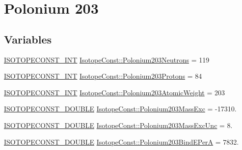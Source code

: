 \hypertarget{group___isotope_const-_polonium-_po203}{}\section{Polonium 203}
\label{group___isotope_const-_polonium-_po203}
\subsection*{Variables}
\begin{DoxyCompactItemize}
\item 
\mbox{\hyperlink{group___isotope_const-_macros_ga5f18360b3e99483a35c32d789e62621c}{I\+S\+O\+T\+O\+P\+E\+C\+O\+N\+S\+T\+\_\+\+I\+NT}} \mbox{\hyperlink{group___isotope_const-_polonium-_po203_gad34dfe27de2839b8dc656c7039330911}{Isotope\+Const\+::\+Polonium203\+Neutrons}} = 119
\item 
\mbox{\hyperlink{group___isotope_const-_macros_ga5f18360b3e99483a35c32d789e62621c}{I\+S\+O\+T\+O\+P\+E\+C\+O\+N\+S\+T\+\_\+\+I\+NT}} \mbox{\hyperlink{group___isotope_const-_polonium-_po203_ga0ed0792985d9912199b290924bc2a84c}{Isotope\+Const\+::\+Polonium203\+Protons}} = 84
\item 
\mbox{\hyperlink{group___isotope_const-_macros_ga5f18360b3e99483a35c32d789e62621c}{I\+S\+O\+T\+O\+P\+E\+C\+O\+N\+S\+T\+\_\+\+I\+NT}} \mbox{\hyperlink{group___isotope_const-_polonium-_po203_gad083c15521cf9ab6bb1863c5d521081b}{Isotope\+Const\+::\+Polonium203\+Atomic\+Weight}} = 203
\item 
\mbox{\hyperlink{group___isotope_const-_macros_ga8f45a7272ce02c0b4c65c44636ed719a}{I\+S\+O\+T\+O\+P\+E\+C\+O\+N\+S\+T\+\_\+\+D\+O\+U\+B\+LE}} \mbox{\hyperlink{group___isotope_const-_polonium-_po203_gadf9dc3a7632f7ef079c24e460efe82cf}{Isotope\+Const\+::\+Polonium203\+Mass\+Exc}} = -\/17310.
\item 
\mbox{\hyperlink{group___isotope_const-_macros_ga8f45a7272ce02c0b4c65c44636ed719a}{I\+S\+O\+T\+O\+P\+E\+C\+O\+N\+S\+T\+\_\+\+D\+O\+U\+B\+LE}} \mbox{\hyperlink{group___isotope_const-_polonium-_po203_ga34462c3d05c244825da925abff928da6}{Isotope\+Const\+::\+Polonium203\+Mass\+Exc\+Unc}} = 8.
\item 
\mbox{\hyperlink{group___isotope_const-_macros_ga8f45a7272ce02c0b4c65c44636ed719a}{I\+S\+O\+T\+O\+P\+E\+C\+O\+N\+S\+T\+\_\+\+D\+O\+U\+B\+LE}} \mbox{\hyperlink{group___isotope_const-_polonium-_po203_ga8765efbb3d9a2edc3069045904960be5}{Isotope\+Const\+::\+Polonium203\+Bind\+E\+PerA}} = 7832.
\item 

\end{DoxyCompactItemize}
